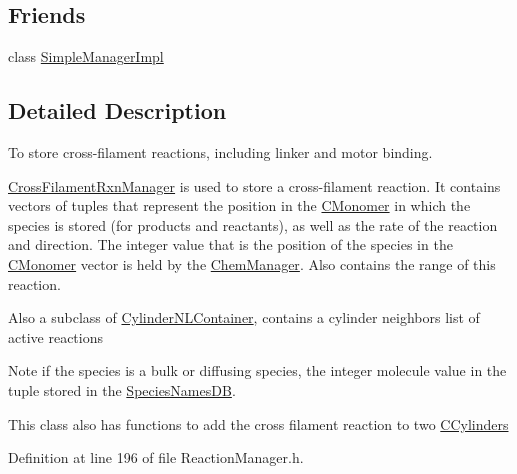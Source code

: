 \subsection*{Friends}
\begin{DoxyCompactItemize}
\item 
class \hyperlink{classCrossFilamentRxnManager_a65026d22c7682cf798dda845cac7573a}{Simple\+Manager\+Impl}
\end{DoxyCompactItemize}


\subsection{Detailed Description}
To store cross-\/filament reactions, including linker and motor binding. 

\hyperlink{classCrossFilamentRxnManager}{Cross\+Filament\+Rxn\+Manager} is used to store a cross-\/filament reaction. It contains vectors of tuples that represent the position in the \hyperlink{classCMonomer}{C\+Monomer} in which the species is stored (for products and reactants), as well as the rate of the reaction and direction. The integer value that is the position of the species in the \hyperlink{classCMonomer}{C\+Monomer} vector is held by the \hyperlink{classChemManager}{Chem\+Manager}. Also contains the range of this reaction.

Also a subclass of \hyperlink{classCylinderNLContainer}{Cylinder\+N\+L\+Container}, contains a cylinder neighbors list of active reactions

\begin{DoxyNote}{Note}
if the species is a bulk or diffusing species, the integer molecule value in the tuple stored in the \hyperlink{classSpeciesNamesDB}{Species\+Names\+D\+B}.
\end{DoxyNote}
This class also has functions to add the cross filament reaction to two \hyperlink{classCCylinder}{C\+Cylinders} 

Definition at line 196 of file Reaction\+Manager.\+h.



